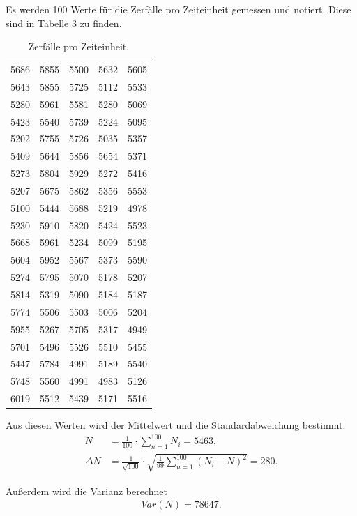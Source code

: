 Es werden 100 Werte für die Zerfälle pro Zeiteinheit gemessen und notiert. Diese sind in Tabelle 3 zu finden.
\begin{table}[H]
  \centering
  \caption{Zerfälle pro Zeiteinheit.}
  \label{tab:Parameter}
  \begin{tabular}{c c c c c}
    \bottomrule
     5686&5855 &5500&5632&5605 \\
     5643&5855 &5725   &5112&5533 \\
     5280&5961  &5581  &5280&5069 \\
     5423&5540  &5739  &5224 &5095 \\
     5202&5755  &5726  &5035 &5357 \\
     5409&5644  &5856  &5654   &5371 \\
     5273&5804  &5929  &5272     &5416 \\
     5207&5675  &5862  &5356     &5553 \\
     5100&5444  &5688  &5219     &4978 \\
     5230&5910  &5820  &5424     &5523 \\
     5668&5961  &5234  &5099     &5195 \\
     5604&5952  &5567  &5373     &5590 \\
     5274&5795  &5070  &5178     &5207 \\
     5814&5319  &5090  &5184     &5187 \\
     5774&5506  &5503  &5006     &5204 \\
     5955&5267  &5705  &5317     &4949 \\
     5701&5496  &5526  &5510 &5455 \\
     5447&5784  &4991  &5189     &5540 \\
     5748&5560  &4991  &4983     &5126 \\
     6019&5512  &5439  &5171     &5516 \\
  \bottomrule
  \end{tabular}
\end{table}

\noindent Aus diesen Werten wird der Mittelwert und die Standardabweichung bestimmt:
\begin{align*}
N &= \frac{1}{100}\cdot \sum_{n=1}^{100} N_i = 5463, \\
\Delta N &=\frac{1}{\sqrt{100}} \cdot \sqrt{\frac{1}{99} \sum_{n=1}^{100} (N_i - N)^2} = 280.
\end{align*}

\noindent Außerdem wird die Varianz berechnet
\begin{align*}
Var(N) = 78647 .
\end{align*}

